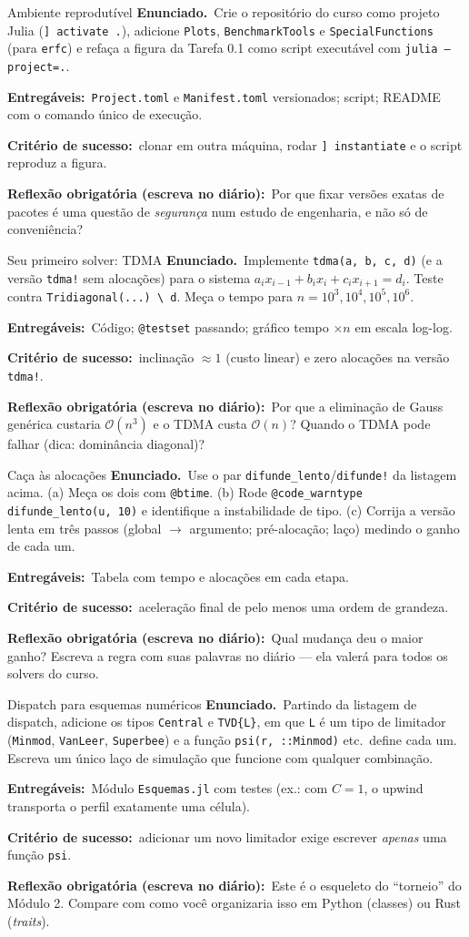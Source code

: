 \documentclass[10pt,a4paper,twocolumn,openany]{report}
\newcommand{\enunciado}{\noindent\textbf{Enunciado.}\ }
\newcommand{\entregaveis}{\par\medskip\noindent\textbf{Entregáveis:}}
\newcommand{\criterio}{\par\medskip\noindent\textbf{Critério de sucesso:}\ }
\newcommand{\reflexao}{\par\medskip\noindent\textbf{Reflexão obrigatória (escreva no diário):}}
\begin{document}
\begin{tarefa}{Ambiente reprodutível}
\enunciado Crie o repositório do curso como projeto Julia
(\texttt{] activate .}), adicione \texttt{Plots}, \texttt{BenchmarkTools} e
\texttt{SpecialFunctions} (para \texttt{erfc}) e refaça a figura da Tarefa
0.1 como script executável com \texttt{julia --project=.}.
\entregaveis\ \texttt{Project.toml} e \texttt{Manifest.toml} versionados;
script; README com o comando único de execução.
\criterio clonar em outra máquina, rodar \texttt{] instantiate} e o script
reproduz a figura.
\reflexao\ Por que fixar versões exatas de pacotes é uma questão de
\emph{segurança} num estudo de engenharia, e não só de conveniência?
\end{tarefa}

\begin{tarefa}{Seu primeiro solver: TDMA}
\enunciado Implemente \texttt{tdma(a, b, c, d)} (e a versão
\texttt{tdma!} sem alocações) para o sistema
$a_ix_{i-1}+b_ix_i+c_ix_{i+1}=d_i$. Teste contra
\texttt{Tridiagonal(...) \textbackslash\ d}. Meça o tempo para
$n=10^3,10^4,10^5,10^6$.
\entregaveis\ Código; \texttt{@testset} passando; gráfico tempo $\times n$
em escala log-log.
\criterio inclinação $\approx1$ (custo linear) e zero alocações na versão
\texttt{tdma!}.
\reflexao\ Por que a eliminação de Gauss genérica custaria $\mathcal O(n^3)$
e o TDMA custa $\mathcal O(n)$? Quando o TDMA pode falhar (dica:
dominância diagonal)?
\end{tarefa}

\begin{tarefa}{Caça às alocações}
\enunciado Use o par \texttt{difunde\_lento}/\texttt{difunde!} da
listagem acima. (a) Meça os dois com \texttt{@btime}. (b) Rode
\texttt{@code\_warntype difunde\_lento(u, 10)} e identifique a instabilidade
de tipo. (c) Corrija a versão lenta em três passos (global $\rightarrow$
argumento; pré-alocação; laço) medindo o ganho de cada um.
\entregaveis\ Tabela com tempo e alocações em cada etapa.
\criterio aceleração final de pelo menos uma ordem de grandeza.
\reflexao\ Qual mudança deu o maior ganho? Escreva a regra com suas
palavras no diário --- ela valerá para todos os solvers do curso.
\end{tarefa}

\begin{tarefa}{Dispatch para esquemas numéricos}
\enunciado Partindo da listagem de dispatch, adicione os tipos
\texttt{Central} e \texttt{TVD\{L\}}, em que \texttt{L} é um tipo de limitador
(\texttt{Minmod}, \texttt{VanLeer}, \texttt{Superbee}) e a função
\texttt{psi(r, ::Minmod)} etc.\ define cada um. Escreva um único laço de
simulação que funcione com qualquer combinação.
\entregaveis\ Módulo \texttt{Esquemas.jl} com testes (ex.: com $C=1$, o
upwind transporta o perfil exatamente uma célula).
\criterio adicionar um novo limitador exige escrever \emph{apenas} uma
função \texttt{psi}.
\reflexao\ Este é o esqueleto do ``torneio'' do Módulo 2. Compare com como
você organizaria isso em Python (classes) ou Rust (\emph{traits}).
\end{tarefa}
\end{document}

